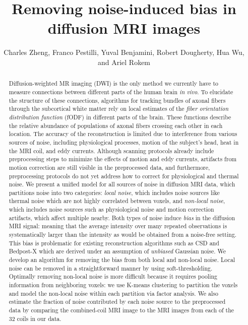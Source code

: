 \documentclass[11pt]{article}
\begin{document}
\newcommand{\tr}{\text{tr}}
\newcommand{\E}{\textbf{E}}
\newcommand{\diag}{\text{diag}}
\newcommand{\argmax}{\text{argmax}}
\newcommand{\argmin}{\text{argmin}}
\newcommand{\Cov}{\text{Cov}}
\newcommand{\Vol}{\text{Vol}}
\pagestyle{fancy}

\title{Removing noise-induced bias in diffusion MRI images}

\author{Charles Zheng, Franco Pestilli, Yuval Benjamini, Robert Dougherty, Hua Wu, and Ariel Rokem}

\maketitle

\begin{abstract}
Diffusion-weighted MR imaging (DWI) is the only method we currently
have to measure connections between different parts of the human brain
\emph{in vivo}.  To elucidate the structure of these connections,
algorithms for tracking bundles of axonal fibers through the
subcortical white matter rely on local estimates of the \emph{fiber
  orientation distribution function} (fODF) in different parts of the
brain. These functions describe the relative abundance of populations
of axonal fibers crossing each other in each location.  The accuracy
of the reconstruction is limited due to interference from various
sources of noise, including physiological processes, motion of the
subject's head, heat in the MRI coil, and eddy currents.  Although
scanning protocols already include preprocessing steps to minimize the
effects of motion and eddy currents, artifacts from motion correction
are still visible in the preprocessed data, and furthermore,
preprocessing protocols do not yet address how to correct for
physiological and thermal noise.  We present a unified model for all
sources of noise in diffusion MRI data, which partitions noise into
two categories: \emph{local noise}, which includes noise sources like
thermal noise which are not highly correlated between voxels, and
\emph{non-local noise}, which includes noise sources such as
physiological noise and motion correction artifacts, which affect
multiple nearby.  Both types of noise induce \emph{bias} in the
diffusion MRI signal: meaning that the average intensity over many
repeated observations is systematically larger than the intensity as
would be obtained from a noise-free setting.  This bias is problematic
for existing reconstruction algorithms such as CSD and Bedpost-X which
are derived under an assumption of \emph{unbiased} Gaussian noise.  We
develop an algorithm for removing the bias from both local and
non-local noise. Local noise can be removed in a straightforward
manner by using soft-thresholding. Optimally removing non-local noise
is more difficult because it requires pooling information from
neighboring voxels: we use K-means clustering to partition the voxels
and model the non-local noise within each partition via factor
analysis.  We also estimate the fraction of noise contributed by each
noise source to the preprocessed data by comparing the combined-coil
MRI image to the MRI images from each of the 32 coils in our data.
\end{abstract}
\end{document}
